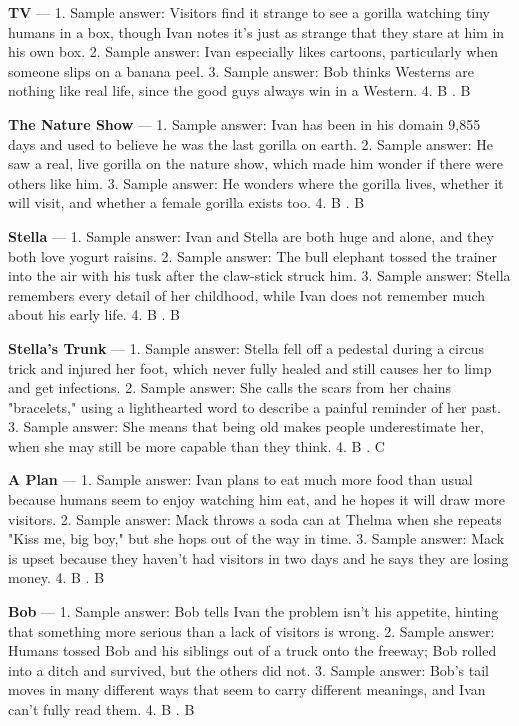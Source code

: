 \documentclass[11pt]{article}
\begin{document}
\noindent\textbf{TV} --- 1. Sample answer: Visitors find it strange to see a gorilla watching tiny humans in a box, though Ivan notes it's just as strange that they stare at him in his own box. 2. Sample answer: Ivan especially likes cartoons, particularly when someone slips on a banana peel. 3. Sample answer: Bob thinks Westerns are nothing like real life, since the good guys always win in a Western. 4. B . B

\noindent\textbf{The Nature Show} --- 1. Sample answer: Ivan has been in his domain 9,855 days and used to believe he was the last gorilla on earth. 2. Sample answer: He saw a real, live gorilla on the nature show, which made him wonder if there were others like him. 3. Sample answer: He wonders where the gorilla lives, whether it will visit, and whether a female gorilla exists too. 4. B . B

\noindent\textbf{Stella} --- 1. Sample answer: Ivan and Stella are both huge and alone, and they both love yogurt raisins. 2. Sample answer: The bull elephant tossed the trainer into the air with his tusk after the claw-stick struck him. 3. Sample answer: Stella remembers every detail of her childhood, while Ivan does not remember much about his early life. 4. B . B

\noindent\textbf{Stella's Trunk} --- 1. Sample answer: Stella fell off a pedestal during a circus trick and injured her foot, which never fully healed and still causes her to limp and get infections. 2. Sample answer: She calls the scars from her chains "bracelets," using a lighthearted word to describe a painful reminder of her past. 3. Sample answer: She means that being old makes people underestimate her, when she may still be more capable than they think. 4. B . C

\noindent\textbf{A Plan} --- 1. Sample answer: Ivan plans to eat much more food than usual because humans seem to enjoy watching him eat, and he hopes it will draw more visitors. 2. Sample answer: Mack throws a soda can at Thelma when she repeats "Kiss me, big boy," but she hops out of the way in time. 3. Sample answer: Mack is upset because they haven't had visitors in two days and he says they are losing money. 4. B . B

\noindent\textbf{Bob} --- 1. Sample answer: Bob tells Ivan the problem isn't his appetite, hinting that something more serious than a lack of visitors is wrong. 2. Sample answer: Humans tossed Bob and his siblings out of a truck onto the freeway; Bob rolled into a ditch and survived, but the others did not. 3. Sample answer: Bob's tail moves in many different ways that seem to carry different meanings, and Ivan can't fully read them. 4. B . B
\end{document}
